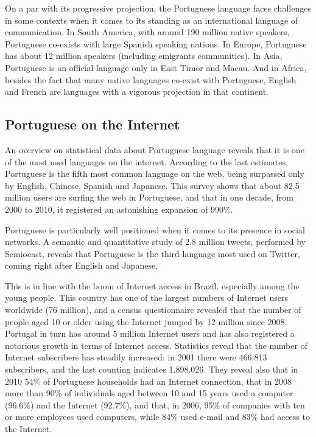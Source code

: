\begin{multicols}{2}
On a par with its progressive projection, the Portuguese language faces challenges in some contexts when it comes to its standing as an international language of communication. In South America, with around 190 million native speakers, Portuguese co-exists with large Spanish speaking nations. In Europe, Portuguese has about 12 million speakers (including emigrants communities). In Asia, Portuguese is an official language only in East Timor and Macau. And in Africa, besides the fact that many native languages co-exist with Portuguese, English and French are languages with a vigorous projection in that continent. 

\subsection{Portuguese on the Internet}

An overview on statistical data about Portuguese language reveals that it is one of the most used languages on the internet. According to the last estimates, Portuguese is the fifth most common language on the web, being surpassed only by English, Chinese, Spanish and Japanese\cite{stat7}. This survey shows that about 82.5 million users are surfing the web in Portuguese, and that in one decade, from 2000 to 2010, it registered an astonishing expansion of 990\%.


Portuguese is particularly well positioned when it comes to its presence in social networks. A semantic and quantitative study of 2.8 million tweets, performed by Semiocast, reveals that Portuguese is the third language most used on Twitter, coming right after English and Japanese\cite{twtrcon}.

This is in line with the boom of Internet access in Brazil, especially among the young people. This country has one of the largest numbers of Internet users worldwide (76 million)\cite{statop20}, and a census questionnaire revealed that the number of people aged 10 or older using the Internet jumped by 12 million since 2008\cite{mybroadband}. Portugal in turn has around 5 million Internet users\cite{stat4} \cite{stat15} and has also registered a notorious growth in terms of Internet access. Statistics reveal that the number of Internet subscribers has steadily increased: in 2001 there were 466.813 subscribers, and the last counting indicates 1.898.026\cite{pordata}.  They reveal also that in 2010 54\% of Portuguese households had an Internet connection, that in 2008 more than 90\% of individuals aged between 10 and 15 years used a computer (96.6\%) and the Internet (92.7\%), and that, in 2006, 95\% of companies with ten or more employees used computers, while 84\% used e-mail and 83\% had access to the Internet\cite{pordata}.


\end{multicols}
